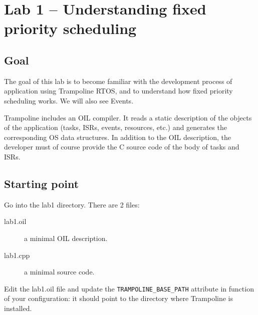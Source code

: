 \documentclass[11pt]{report}
\begin{document}
\chapter{Lab 1 -- Understanding fixed priority scheduling}

\section{Goal}

The goal of this lab is to become familiar with the development
process of application using Trampoline RTOS, and to understand how fixed priority scheduling works.
We will also see Events.

Trampoline includes an OIL compiler.
It reads a static description of the objects of the application (tasks,
ISRs, events, resources, etc.) and generates the corresponding OS data structures.
In addition to the OIL description, the developer must of course provide the C
source code of the body of tasks and ISRs.


\section{Starting point}

Go into the lab1 directory. There are 2 files:

\begin{description}
    \item[lab1.oil] a minimal OIL description.
    \item[lab1.cpp] a minimal source code.
\end{description}

Edit the lab1.oil file and update the \texttt{TRAMPOLINE\_BASE\_PATH} attribute
in function of your configuration: it should point to the directory where Trampoline is installed.




\end{document}
